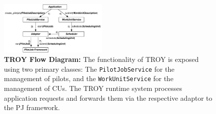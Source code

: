 \documentclass[conference,final]{IEEEtran}
\newcommand{\alnote}[1]{ {\textcolor{blue} { ***andre: #1 }}}
\newcommand{\alnote}[1]{}
\newcommand{\cu}{CU}
\begin{document}








\begin{figure}[t]
	\centering
		\includegraphics[width=0.47\textwidth]{figures/troy_flow.pdf}
	\caption{\textbf{TROY Flow Diagram:} The functionality of TROY is exposed 
	using two primary classes: The \texttt{PilotJobService} for the management 
	of pilots, and the \texttt{WorkUnitService} for the management of \cu s. The 
	TROY runtime system processes application requests and forwards them via the 
	respective adaptor to the PJ framework.
	}
	\label{fig:figures_troy_flow}
\end{figure}
\end{document}
